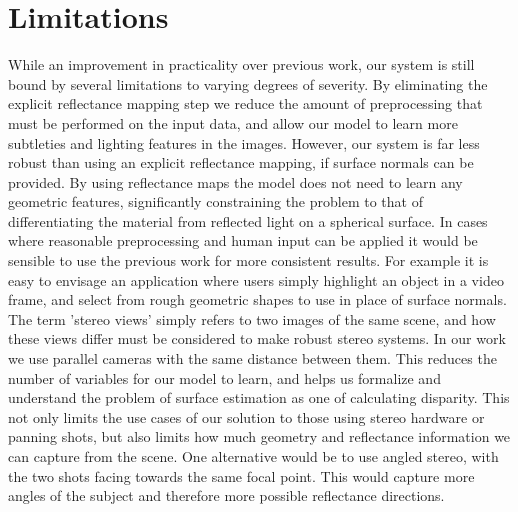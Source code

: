 \documentclass[ %
                    author={Gavin Parker},
                supervisor={Dr. Neill Campbell},
                    degree={MEng},
                     title={Deep Siamese Networks for Illumination Estimation from Stereo Images},
                  subtitle={},
                      type={research},
                      year={2018} ]{dissertation}
\begin{document}
\section{Limitations}
While an improvement in practicality over previous work, our system is still bound by several limitations to varying degrees of severity. By eliminating the explicit reflectance mapping step we reduce the amount of preprocessing that must be performed on the input data, and allow our model to learn more subtleties and lighting features in the images. However, our system is far less robust than using an explicit reflectance mapping, if surface normals can be provided. By using reflectance maps the model does not need to learn any geometric features, significantly constraining the problem to that of differentiating the material from reflected light on a spherical surface. In cases where reasonable preprocessing and human input can be applied it would be sensible to use the previous work for more consistent results. For example it is easy to envisage an application where users simply highlight an object in a video frame, and select from rough geometric shapes to use in place of surface normals.
\newline
The term 'stereo views' simply refers to two images of the same scene, and how these views differ must be considered to make robust stereo systems. In our work we use parallel cameras with the same distance between them. This reduces the number of variables for our model to learn, and helps us formalize and understand the problem of surface estimation as one of calculating disparity. This not only limits the use cases of our solution to those using stereo hardware or panning shots, but also limits how much geometry and reflectance information we can capture from the scene. One alternative would be to use angled stereo, with the two shots facing towards the same focal point. This would capture more angles of the subject and therefore more possible reflectance directions.
\newline
\end{document}

